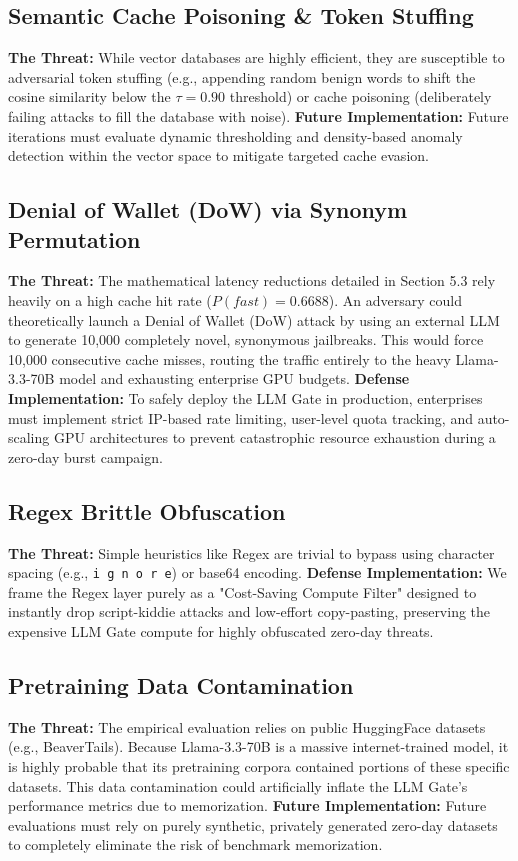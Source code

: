 \documentclass[12pt,a4paper]{article}
\begin{document}
\subsection{Semantic Cache Poisoning \& Token Stuffing}
\textbf{The Threat:} While vector databases are highly efficient, they are susceptible to adversarial token stuffing (e.g., appending random benign words to shift the cosine similarity below the $\tau=0.90$ threshold) or cache poisoning (deliberately failing attacks to fill the database with noise).
\textbf{Future Implementation:} Future iterations must evaluate dynamic thresholding and density-based anomaly detection within the vector space to mitigate targeted cache evasion.

\subsection{Denial of Wallet (DoW) via Synonym Permutation}
\textbf{The Threat:} The mathematical latency reductions detailed in Section 5.3 rely heavily on a high cache hit rate ($P(fast)=0.6688$). An adversary could theoretically launch a Denial of Wallet (DoW) attack by using an external LLM to generate 10,000 completely novel, synonymous jailbreaks. This would force 10,000 consecutive cache misses, routing the traffic entirely to the heavy Llama-3.3-70B model and exhausting enterprise GPU budgets.
\textbf{Defense Implementation:} To safely deploy the LLM Gate in production, enterprises must implement strict IP-based rate limiting, user-level quota tracking, and auto-scaling GPU architectures to prevent catastrophic resource exhaustion during a zero-day burst campaign.

\subsection{Regex Brittle Obfuscation}
\textbf{The Threat:} Simple heuristics like Regex are trivial to bypass using character spacing (e.g., \texttt{i g n o r e}) or base64 encoding.
\textbf{Defense Implementation:} We frame the Regex layer purely as a "Cost-Saving Compute Filter" designed to instantly drop script-kiddie attacks and low-effort copy-pasting, preserving the expensive LLM Gate compute for highly obfuscated zero-day threats.

\subsection{Pretraining Data Contamination}
\textbf{The Threat:} The empirical evaluation relies on public HuggingFace datasets (e.g., BeaverTails). Because Llama-3.3-70B is a massive internet-trained model, it is highly probable that its pretraining corpora contained portions of these specific datasets. This data contamination could artificially inflate the LLM Gate's performance metrics due to memorization.
\textbf{Future Implementation:} Future evaluations must rely on purely synthetic, privately generated zero-day datasets to completely eliminate the risk of benchmark memorization.
\end{document}
